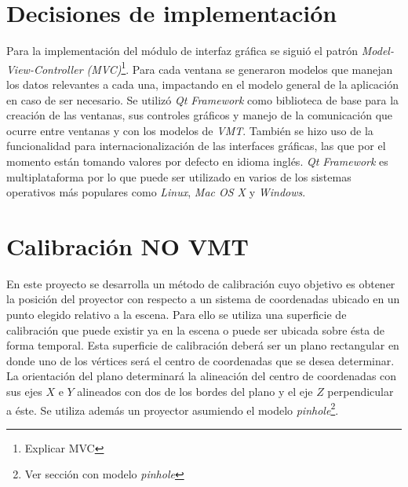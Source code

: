 \section{Decisiones de implementación}
Para la implementación del módulo de interfaz gráfica se siguió el patrón \emph{Model-View-Controller (MVC)}\footnote{Explicar MVC}. Para cada ventana se generaron modelos que manejan los datos relevantes a cada una, impactando en el modelo general de la aplicación en caso de ser necesario.
Se utilizó \emph{Qt Framework} \cite{Qt-framework} como biblioteca de base para la creación de las ventanas, sus controles gráficos y manejo de la comunicación que ocurre entre ventanas y con los modelos de \emph{VMT}. También se hizo uso de la funcionalidad para internacionalización de las interfaces gráficas, las que por el momento están tomando valores por defecto en idioma inglés. \emph{Qt Framework} es multiplataforma por lo que puede ser utilizado en varios de los sistemas operativos más populares como \emph{Linux}, \emph{Mac OS X} y \emph{Windows}.

\section{Calibración NO VMT}
En este proyecto se desarrolla un método de calibración cuyo objetivo es obtener la posición del proyector con respecto a un sistema de coordenadas ubicado en un punto elegido relativo a la escena. Para ello se utiliza una superficie de calibración que puede existir ya en la escena o puede ser ubicada sobre ésta de forma temporal. Esta superficie de calibración deberá ser un plano rectangular en donde uno de los vértices será el centro de coordenadas que se desea determinar. La orientación del plano determinará la alineación del centro de coordenadas con sus ejes $X$ e $Y$ alineados con dos de los bordes del plano y el eje $Z$ perpendicular a éste. Se utiliza además un proyector asumiendo el modelo \emph{pinhole}\footnote{Ver sección con modelo \emph{pinhole}}.

